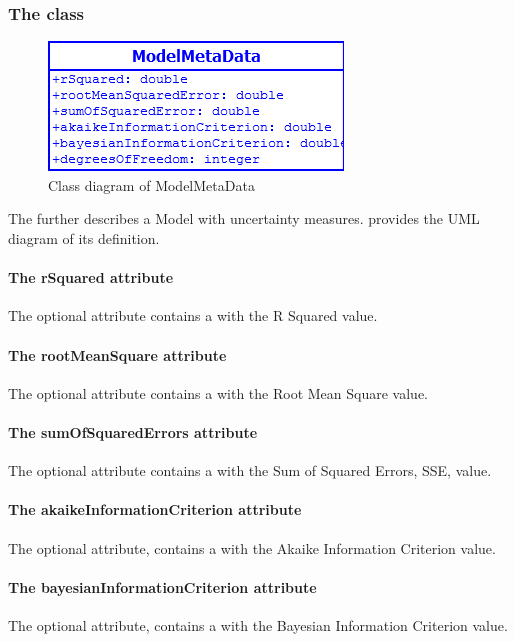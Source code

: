 \subsubsection{The  class}
\label{modelmetadata-class}

\begin{figure}[h]
	\includegraphics[scale=0.8]{img/ModelMetaData}
	\caption{Class diagram of ModelMetaData}
	\label{ModelMetaData}
\end{figure}

The \ModelMetaData further describes a Model with uncertainty measures.
 provides the UML diagram of its definition.

\paragraph{The rSquared attribute}
The optional attribute  contains a  with the R
Squared value.

\paragraph{The rootMeanSquare attribute}
The optional attribute  contains a  with
the Root Mean Square value.

\paragraph{The sumOfSquaredErrors attribute}
The optional attribute  contains a 
with the Sum of Squared Errors, SSE, value.

\paragraph{The akaikeInformationCriterion attribute}
The optional attribute,  contains a
 with the Akaike Information Criterion value.

\paragraph{The bayesianInformationCriterion attribute}
The optional attribute,  contains a
 with the Bayesian Information Criterion value.

